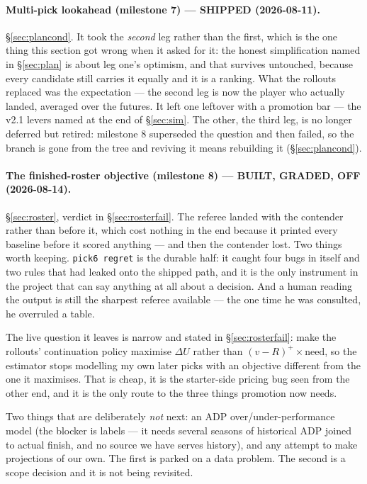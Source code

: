 \documentclass[10pt,a4paper]{article}
\theoremstyle{plain}
\theoremstyle{definition}
\theoremstyle{remark}
\newcommand{\code}[1]{\texttt{\small #1}}
\begin{document}
\paragraph{Multi-pick lookahead (milestone 7) --- SHIPPED (2026-08-11).}
\S\ref{sec:plancond}. It took the \emph{second} leg rather than the first, which is the
one thing this section got wrong when it asked for it: the honest simplification named in
\S\ref{sec:plan} is about leg one's optimism, and that survives untouched, because every
candidate still carries it equally and it is a ranking. What the rollouts replaced was the
expectation --- the second leg is now the player who actually landed, averaged over the
futures. It left one leftover with a promotion bar --- the v2.1 levers named at the end of
\S\ref{sec:sim}. The other, the third leg, is no longer deferred but retired: milestone 8
superseded the question and then failed, so the branch is gone from the tree and reviving
it means rebuilding it (\S\ref{sec:plancond}).

\paragraph{The finished-roster objective (milestone 8) --- BUILT, GRADED, OFF (2026-08-14).}
\S\ref{sec:roster}, verdict in \S\ref{sec:rosterfail}. The referee landed with the
contender rather than before it, which cost nothing in the end because it printed every
baseline before it scored anything --- and then the contender lost. Two things worth
keeping. \code{pick6 regret} is the durable half: it caught four bugs in itself and two
rules that had leaked onto the shipped path, and it is the only instrument in the project
that can say anything at all about a decision. And a human reading the output is still the
sharpest referee available --- the one time he was consulted, he overruled a table.

The live question it leaves is narrow and stated in \S\ref{sec:rosterfail}: make the
rollouts' continuation policy maximise $\Delta U$ rather than $(v-R)^+ \times
\mathrm{need}$, so the estimator stops modelling my own later picks with an objective
different from the one it maximises. That is cheap, it is the starter-side pricing bug seen
from the other end, and it is the only route to the three things promotion now needs.

Two things that are deliberately \emph{not} next: an ADP over/under-performance model
(the blocker is labels --- it needs several seasons of historical ADP joined to actual
finish, and no source we have serves history), and any attempt to make projections of our
own. The first is parked on a data problem. The second is a scope decision and it is not
being revisited.
\end{document}
